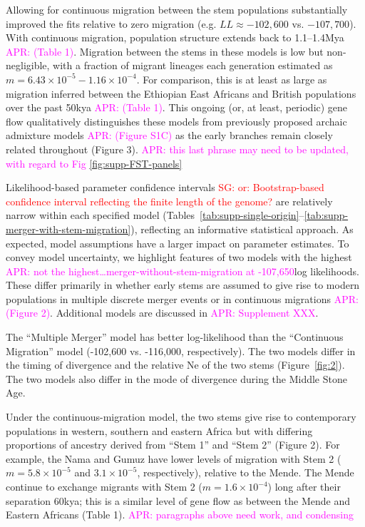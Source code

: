 \documentclass[]{article}
\newcommand{\sgcomment}[1]{{\textcolor{red}{SG: #1}}}
\newcommand{\aprcomment}[1]{{\textcolor{magenta}{APR: #1}}}
\begin{document}
Allowing for continuous migration between the stem populations substantially
improved the fits relative to zero migration (e.g. $LL \approx -102,600$ vs.
$-107,700$). With continuous migration, population structure extends back to
1.1--1.4Mya \aprcomment{(Table 1)}. Migration between the stems in these models
is low but non-negligible, with a fraction of migrant lineages each generation
estimated as $m=6.43\times10^{-5}-1.16\times10^{-4}$. For comparison, this is
at least as large as migration inferred between the Ethiopian East Africans and
British populations over the past 50kya \aprcomment{(Table 1)}. This ongoing
(or, at least, periodic) gene flow qualitatively distinguishes these models
from previously proposed archaic admixture models \aprcomment{(Figure S1C)} as
the early branches remain closely related throughout (Figure 3).
\aprcomment{this last phrase may need to be updated, with regard to Fig
\ref{fig:supp-FST-panels}}

Likelihood-based parameter confidence intervals  \sgcomment{or: Bootstrap-based confidence interval reflecting the finite length of the genome?}   are relatively narrow within
each specified model
(Tables~\ref{tab:supp-single-origin}--\ref{tab:supp-merger-with-stem-migration}),
reflecting an informative statistical approach. As expected, model assumptions
have a larger impact on parameter estimates. To convey model uncertainty, we
highlight features of two models with the highest \aprcomment{not the
highest\ldots merger-without-stem-migration at -107,650}log likelihoods. These
differ primarily in whether early stems are assumed to give rise to modern
populations in multiple discrete merger events or in continuous migrations
\aprcomment{(Figure 2)}. Additional models are discussed in
\aprcomment{Supplement XXX}.

The “Multiple Merger” model has better log-likelihood than the “Continuous
Migration” model (-102,600 vs. -116,000, respectively). The two models differ
in the timing of divergence and the relative Ne of the two stems
(Figure~\ref{fig:2}). The two models also differ in the mode of divergence
during the Middle Stone Age. 

Under the continuous-migration model, the two stems give rise to contemporary
populations in western, southern and eastern Africa but with differing
proportions of ancestry derived from “Stem 1” and “Stem 2” (Figure 2). For
example, the Nama and Gumuz have lower levels of migration with Stem 2
($m=5.8\times10^{-5}$ and $3.1\times10^{-5}$, respectively), relative to the
Mende. The Mende continue to exchange migrants with Stem 2
($m=1.6\times10^{-4}$) long after their separation 60kya; this is a similar
level of gene flow as between the Mende and Eastern Africans (Table 1). 
\aprcomment{paragraphs above need work, and condensing}
\end{document}
